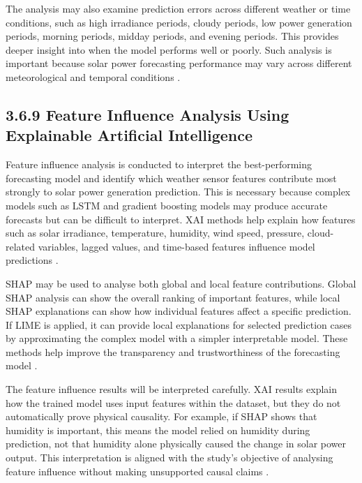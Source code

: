 The analysis may also examine prediction errors across different weather or time conditions, such as high irradiance periods, cloudy periods, low power generation periods, morning periods, midday periods, and evening periods. This provides deeper insight into when the model performs well or poorly. Such analysis is important because solar power forecasting performance may vary across different meteorological and temporal conditions \parencite{TsaiLo2025, Pongphaw2025, Eren2025}.

\subsection{3.6.9 Feature Influence Analysis Using Explainable Artificial Intelligence}

Feature influence analysis is conducted to interpret the best-performing forecasting model and identify which weather sensor features contribute most strongly to solar power generation prediction. This is necessary because complex models such as LSTM and gradient boosting models may produce accurate forecasts but can be difficult to interpret. XAI methods help explain how features such as solar irradiance, temperature, humidity, wind speed, pressure, cloud-related variables, lagged values, and time-based features influence model predictions \parencite{JnanaVarshitha2025, Eren2025, TsaiLo2025}.

SHAP may be used to analyse both global and local feature contributions. Global SHAP analysis can show the overall ranking of important features, while local SHAP explanations can show how individual features affect a specific prediction. If LIME is applied, it can provide local explanations for selected prediction cases by approximating the complex model with a simpler interpretable model. These methods help improve the transparency and trustworthiness of the forecasting model \parencite{Pongphaw2025, Duvuru2026, Ma2025}.

The feature influence results will be interpreted carefully. XAI results explain how the trained model uses input features within the dataset, but they do not automatically prove physical causality. For example, if SHAP shows that humidity is important, this means the model relied on humidity during prediction, not that humidity alone physically caused the change in solar power output. This interpretation is aligned with the study’s objective of analysing feature influence without making unsupported causal claims \parencite{JnanaVarshitha2025, TsaiLo2025, Eren2025}.

